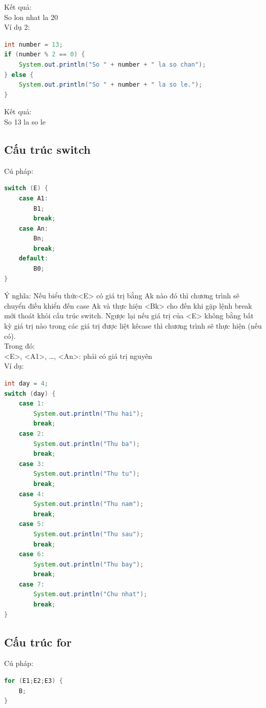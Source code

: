 \indent Kết quả:\\
{\ttfamily So lon nhat la 20}\\

\indent Ví dụ 2:
\begin{lstlisting}[escapechar=!,language=java]	
int number = 13;
if (number % 2 == 0) {
	System.out.println("So " + number + " la so chan");
} else {
	System.out.println("So " + number + " la so le.");
}
\end{lstlisting}

\indent Kết quả:\\
{\ttfamily So 13 la so le}
\subsection{Cấu trúc switch}
\indent Cú pháp:
\begin{lstlisting}[escapechar=',language=java]	
switch (E) {
 	case A1:
		B1;
		break;
	case An:
		Bn;
		break;
	default:
		B0;
}
\end{lstlisting}


\indent Ý nghĩa: Nếu biểu thức{\ttfamily <E>} có giá trị bằng {\ttfamily Ak} nào đó thì chương trình sẽ chuyển điều khiển đến {\ttfamily case Ak} và thực hiện {\ttfamily <Bk>} cho đến khi gặp lệnh {\ttfamily break} mới thoát khỏi cấu trúc {\ttfamily switch}. Ngược lại nếu giá trị của {\ttfamily <E>} không bằng bất kỳ giá trị nào trong các giá trị được liệt kê{\ttfamily case} thì chương trình sẽ thực hiện {} (nếu có).\\
\indent Trong đó:\\
{\ttfamily <E>, <A1>, …, <An>}: phải có giá trị nguyên\\
\indent Ví dụ:
\begin{lstlisting}[escapechar=!,language=java]	
int day = 4;
switch (day) {
	case 1:
		System.out.println("Thu hai");
		break;
	case 2:
		System.out.println("Thu ba");
		break;
	case 3:
		System.out.println("Thu tu");
		break;
	case 4:
		System.out.println("Thu nam");
		break;
	case 5:
		System.out.println("Thu sau");
		break;
	case 6:
		System.out.println("Thu bay");
		break;
	case 7:
		System.out.println("Chu nhat");
		break;
}
\end{lstlisting}
\subsection{Cấu trúc for}
\indent Cú pháp:
\begin{lstlisting}[escapechar=',language=java]	
for (E1;E2;E3) {
	B;
}
\end{lstlisting}

